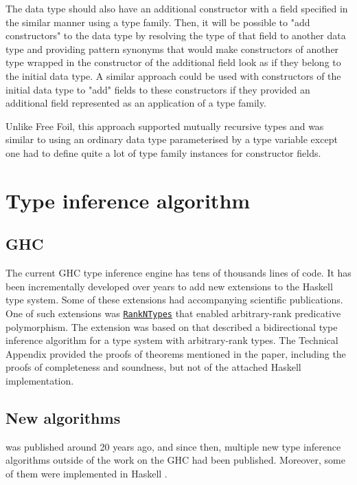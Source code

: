 The data type should also have an additional constructor with a field specified in the similar manner using a type family. Then, it will be possible to "add constructors" to the data type by resolving the type of that field to another data type and providing pattern synonyms that would make constructors of another type wrapped in the constructor of the additional field look as if they belong to the initial data type. A similar approach could be used with constructors of the initial data type to "add" fields to these constructors if they provided an additional field represented as an application of a type family.

Unlike Free Foil, this approach supported mutually recursive types and was similar to using an ordinary data type parameterised by a type variable except one had to define quite a lot of type family instances for constructor fields.

\section{Type inference algorithm}
\label{sec:TypeInferenceAlgorithm}

\subsection{GHC}

The current GHC type inference engine has tens of thousands lines of code.
It has been incrementally developed over years to add new extensions to the Haskell type system.
Some of these extensions had accompanying scientific publications.
One of such extensions was \href{https://gitlab.haskell.org/haskell/prime/-/wikis/RankNTypes}{\texttt{RankNTypes}} that enabled arbitrary-rank predicative polymorphism.
The extension was based on \cite{jones-practical-2007} that described a bidirectional type inference algorithm for a type system with arbitrary-rank types. The Technical Appendix \cite{practical-type-inference-proofs} provided the proofs of theorems mentioned in the paper, including the proofs of completeness and soundness, but not of the attached Haskell implementation.

\subsection{New algorithms}

\cite{jones-practical-2007} was published around 20 years ago, and since then, multiple new type inference algorithms outside of the work on the GHC had been published.
Moreover, some of them were implemented in Haskell \cite{github-goldenberg-artem-goldenbergbidirectionalsystem-2025} \cite{github-choi-kwanghoonbidi-2025} \cite{github-chen-cu1ch3ntype-inference-zoo-2025}.

